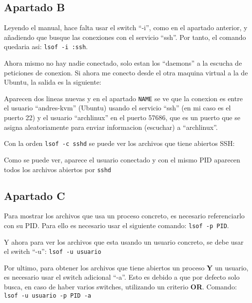 \documentclass{article}
\begin{document}
\subsection*{Apartado B}
Leyendo el manual, hace falta usar el switch ``-i'', como en el apartado anterior, y añadiendo que busque las conexiones con el servicio ``ssh''. Por tanto, el comando quedaria asi: \verb|lsof -i :ssh|.


Ahora mismo no hay nadie conectado, solo estan los ``daemons'' a la escucha de peticiones de conexion. Si ahora me conecto desde el otra maquina virtual a la de Ubuntu, la salida es la siguiente:


Aparecen dos lineas nuevas y en el apartado \verb|NAME| se ve que la conexion es entre el usuario ``andres-kvm'' (Ubuntu) usando el servicio ``ssh'' (en mi caso es el puerto 22)  y el usuario ``archlinux'' en el puerto 57686, que es un puerto que se asigna aleatoriamente para enviar informacion (escuchar) a ``archlinux''.

Con la orden \verb|lsof -c sshd| se puede ver los archivos que tiene abiertos SSH:


Como se puede ver, aparece el usuario conectado y con el mismo PID aparecen todos los archivos abiertos por \verb|sshd|


\subsection*{Apartado C}
Para mostrar los archivos que usa un proceso concreto, es necesario referenciarlo con su PID. Para ello es necesario usar el siguiente comando: \verb|lsof -p PID|.


Y ahora para ver los archivos que esta usando un usuario concreto, se debe usar el switch ``-u'': \verb|lsof -u usuario|


Por ultimo, para obtener los archivos que tiene abiertos un proceso \textbf{Y} un usuario, es necesario usar el switch adicional ``-a''. Esto es debido a que por defecto solo busca, en caso de haber varios switches, utilizando un criterio \textbf{OR}. Comando: \verb|lsof -u usuario -p PID -a|
\end{document}
